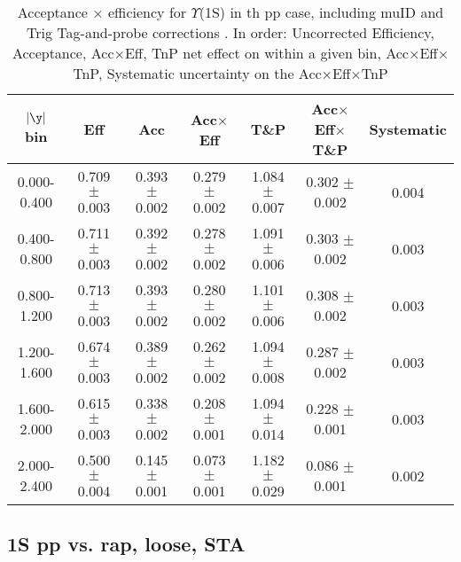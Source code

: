 \begin{table}[h]
\begin{center}
\begin{tabular}{|c|c|c|c|c|c|c|}
\hline
$\vert\y\vert$ bin& Eff & Acc & Acc$\times$Eff & T\&P & Acc$\times$Eff$\times$T\&P  & Systematic \\
\hline 
\hline
0.000-0.400 & 0.709 $\pm$ 0.003 & 0.393 $\pm$ 0.002 & 0.279 $\pm$ 0.002 & 1.084 $\pm$ 0.007 & 0.302 $\pm$ 0.002 & 0.004 \\
0.400-0.800 & 0.711 $\pm$ 0.003 & 0.392 $\pm$ 0.002 & 0.278 $\pm$ 0.002 & 1.091 $\pm$ 0.006 & 0.303 $\pm$ 0.002 & 0.003 \\
0.800-1.200 & 0.713 $\pm$ 0.003 & 0.393 $\pm$ 0.002 & 0.280 $\pm$ 0.002 & 1.101 $\pm$ 0.006 & 0.308 $\pm$ 0.002 & 0.003 \\
1.200-1.600 & 0.674 $\pm$ 0.003 & 0.389 $\pm$ 0.002 & 0.262 $\pm$ 0.002 & 1.094 $\pm$ 0.008 & 0.287 $\pm$ 0.002 & 0.003 \\
1.600-2.000 & 0.615 $\pm$ 0.003 & 0.338 $\pm$ 0.002 & 0.208 $\pm$ 0.001 & 1.094 $\pm$ 0.014 & 0.228 $\pm$ 0.001 & 0.003 \\
2.000-2.400 & 0.500 $\pm$ 0.004 & 0.145 $\pm$ 0.001 & 0.073 $\pm$ 0.001 & 1.182 $\pm$ 0.029 & 0.086 $\pm$ 0.001 & 0.002 \\
\hline                           
\end{tabular}
\caption{Acceptance $\times$ efficiency for $\Upsilon$(1S) in th pp
case, including muID and Trig Tag-and-probe corrections . In order: Uncorrected Efficiency, Acceptance, Acc$\times$Eff,
TnP net effect on within a given bin, Acc$\times$Eff$\times$TnP,
Systematic uncertainty on the  Acc$\times$Eff$\times$TnP }
\label{Aet_1S_pythia_rap2014_muIDTrig}
\end{center}
\end{table}


\subsection{1S pp vs. rap, loose, STA}

